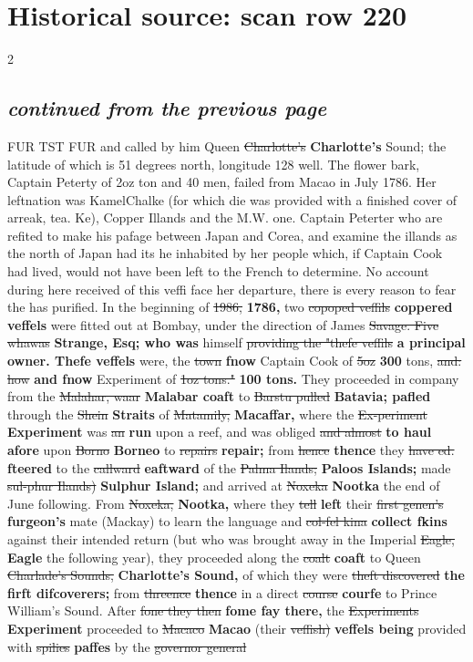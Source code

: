 \documentclass[10pt]{article}
\begin{document}
\section*{Historical source: scan row 220}
\begin{multicols}{2}
\subsection*{\textit{continued from the previous page}}
FUR TST FUR and called by him Queen \sout{Charlotte’s} \textbf{Charlotte's} Sound; the latitude of which is 51 degrees north, longitude 128 well. The flower bark, Captain Peterty of 2oz ton and 40 men, failed from Macao in July 1786. Her leftnation was KamelChalke (for which die was provided with a finished cover of arreak, tea. Ke), Copper Illands and the M.W. one. Captain Peterter who are refited to make his pafage between Japan and Corea, and examine the illands as the north of Japan had its he inhabited by her people which, if Captain Cook had lived, would not have been left to the French to determine. No account during here received of this veffi face her departure, there is every reason to fear the has purified. In the beginning of \sout{1986,} \textbf{1786,} two \sout{copoped veffils} \textbf{coppered veffels} were fitted out at Bombay, under the direction of James \sout{Savage. Five whawas} \textbf{Strange, Esq; who was} himself \sout{providing the "thefe veffils} \textbf{a principal owner. Thefe veffels} were, the \sout{town} \textbf{fnow} Captain Cook of \sout{5oz} \textbf{300} tons, \sout{and: how} \textbf{and fnow} Experiment of \sout{1oz tons."} \textbf{100 tons.} They proceeded in company from the \sout{Malahar, waar} \textbf{Malabar coaft} to \sout{Barstu pulled} \textbf{Batavia; pafled} through the \sout{Shein} \textbf{Straits} of \sout{Matamily,} \textbf{Macaffar,} where the \sout{Ex-periment} \textbf{Experiment} was \sout{an} \textbf{run} upon a reef, and was obliged \sout{and almost} \textbf{to haul afore} upon \sout{Borno} \textbf{Borneo} to \sout{repairs} \textbf{repair;} from \sout{hence} \textbf{thence} they \sout{have ed.} \textbf{fteered} to the \sout{callward} \textbf{eaftward} of the \sout{Palma Ilands;} \textbf{Paloos Islands;} made \sout{sul-phur Ilands)} \textbf{Sulphur Island;} and arrived at \sout{Noxeka} \textbf{Nootka} the end of June following. From \sout{Noxeka,} \textbf{Nootka,} where they \sout{tell} \textbf{left} their \sout{first genen's} \textbf{furgeon's} mate (Mackay) to learn the language and \sout{col-fel kina} \textbf{collect fkins} against their intended return (but who was brought away in the Imperial \sout{Eagle,} \textbf{Eagle} the following year), they proceeded along the \sout{coalt} \textbf{coaft} to Queen \sout{Charlade's Sounds,} \textbf{Charlotte's Sound,} of which they were \sout{theft discovered} \textbf{the firft difcoverers;} from \sout{threence} \textbf{thence} in a direct \sout{course} \textbf{courfe} to Prince William's Sound. After \sout{fone they then} \textbf{fome fay there,} the \sout{Experiments} \textbf{Experiment} proceeded to \sout{Macaco} \textbf{Macao} (their \sout{veffish)} \textbf{veffels being} provided with \sout{spilies} \textbf{paffes} by the \sout{governor general} 
\end{multicols}
\end{document}
